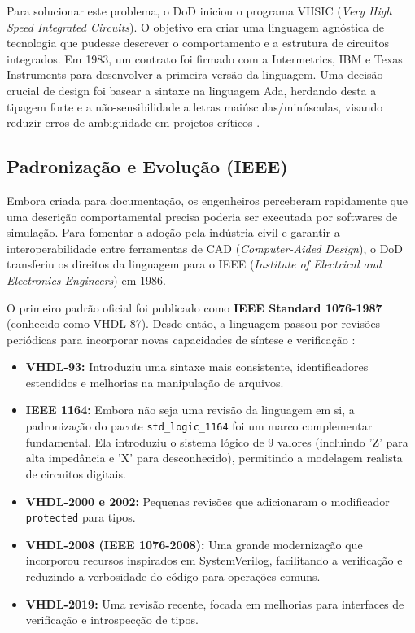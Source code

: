 Para solucionar este problema, o DoD iniciou o programa VHSIC (\textit{Very High Speed Integrated Circuits}). O objetivo era criar uma linguagem agnóstica de tecnologia que pudesse descrever o comportamento e a estrutura de circuitos integrados. Em 1983, um contrato foi firmado com a Intermetrics, IBM e Texas Instruments para desenvolver a primeira versão da linguagem. Uma decisão crucial de design foi basear a sintaxe na linguagem Ada, herdando desta a tipagem forte e a não-sensibilidade a letras maiúsculas/minúsculas, visando reduzir erros de ambiguidade em projetos críticos \cite{ieee2018roots}.

\subsection{Padronização e Evolução (IEEE)}
Embora criada para documentação, os engenheiros perceberam rapidamente que uma descrição comportamental precisa poderia ser executada por softwares de simulação. Para fomentar a adoção pela indústria civil e garantir a interoperabilidade entre ferramentas de CAD (\textit{Computer-Aided Design}), o DoD transferiu os direitos da linguagem para o IEEE (\textit{Institute of Electrical and Electronics Engineers}) em 1986.

O primeiro padrão oficial foi publicado como \textbf{IEEE Standard 1076-1987} (conhecido como VHDL-87). Desde então, a linguagem passou por revisões periódicas para incorporar novas capacidades de síntese e verificação \cite{ieee2009vhdl}:

\begin{itemize}
    \item \textbf{VHDL-93:} Introduziu uma sintaxe mais consistente, identificadores estendidos e melhorias na manipulação de arquivos.
    \item \textbf{IEEE 1164:} Embora não seja uma revisão da linguagem em si, a padronização do pacote \texttt{std\_logic\_1164} foi um marco complementar fundamental. Ela introduziu o sistema lógico de 9 valores (incluindo 'Z' para alta impedância e 'X' para desconhecido), permitindo a modelagem realista de circuitos digitais.
    \item \textbf{VHDL-2000 e 2002:} Pequenas revisões que adicionaram o modificador \texttt{protected} para tipos.
    \item \textbf{VHDL-2008 (IEEE 1076-2008):} Uma grande modernização que incorporou recursos inspirados em SystemVerilog, facilitando a verificação e reduzindo a verbosidade do código para operações comuns.
    \item \textbf{VHDL-2019:} Uma revisão recente, focada em melhorias para interfaces de verificação e introspecção de tipos.
\end{itemize}

